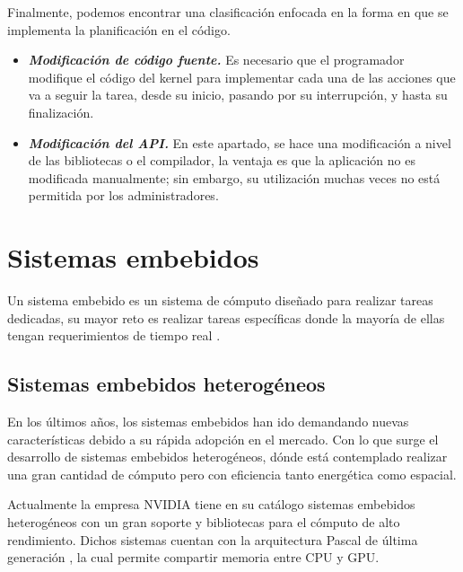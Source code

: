 Finalmente, podemos encontrar una clasificación enfocada en la forma en que se implementa la planificación en el código.

\begin{itemize}

\item \textbf{\textit{Modificación de código fuente.}}
	Es necesario que el programador modifique el código del kernel para implementar cada una de las acciones que va a seguir la tarea, desde su inicio, pasando por su interrupción, y hasta su finalización.
	
\item \textbf{\textit{Modificación del API.}}
	En este apartado, se hace una modificación a nivel de las bibliotecas o el compilador, la ventaja es que la aplicación no es modificada manualmente; sin embargo, su utilización muchas veces no está permitida por los administradores.
	
\end{itemize}

    \section{Sistemas embebidos}

    Un sistema embebido es un sistema de cómputo diseñado para realizar tareas dedicadas, su mayor reto es realizar tareas específicas donde la mayoría de ellas tengan requerimientos de tiempo real \cite{LimPree}.

    \subsection{Sistemas embebidos heterogéneos} \label{sec:seh}
    \vspace{0.3cm}
    En los últimos años, los sistemas embebidos han ido demandando nuevas características debido a su rápida adopción en el mercado. Con lo que surge el desarrollo de sistemas embebidos heterogéneos, dónde está contemplado realizar una gran cantidad de cómputo pero con eficiencia tanto energética como espacial.
    \vspace{0.3cm}

    Actualmente la empresa NVIDIA tiene en su catálogo sistemas embebidos heterogéneos con un gran soporte y bibliotecas para el cómputo de alto rendimiento. Dichos sistemas cuentan con la arquitectura Pascal de última generación \cite{GPUArt}, la cual permite compartir memoria entre CPU y GPU.
               
